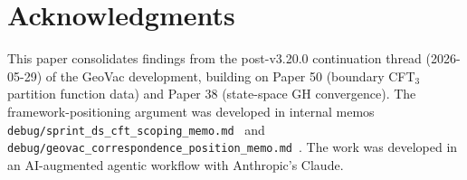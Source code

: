 \documentclass[11pt,a4paper]{article}
\theoremstyle{plain}
\theoremstyle{definition}
\begin{document}
\section*{Acknowledgments}

This paper consolidates findings from the post-v3.20.0 continuation
thread (2026-05-29) of the GeoVac development, building on Paper 50
(boundary CFT$_{3}$ partition function data) and Paper 38 (state-space
GH convergence). The framework-positioning argument was developed in
internal memos
\texttt{debug/sprint\_ds\_cft\_scoping\_memo.md}~\cite{debug:ds_cft_scoping}
and
\texttt{debug/geovac\_correspondence\_position\_memo.md}~\cite{debug:correspondence_position}.
The work was developed in an AI-augmented agentic workflow with
Anthropic's Claude.
\end{document}

